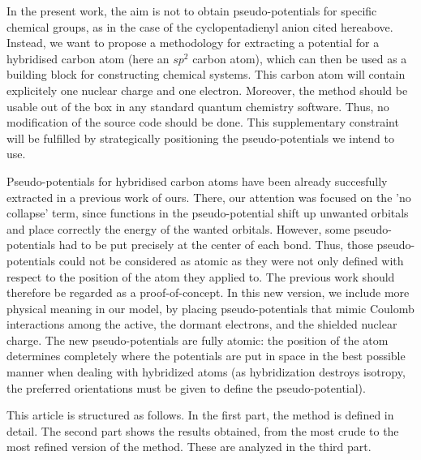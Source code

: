 \documentclass[journal=jctcce,manuscript=article]{achemso}
\begin{document}

In the present work, the aim is not to obtain pseudo-potentials for  specific
chemical groups, as in the case of the cyclopentadienyl anion cited hereabove.
Instead, we want to propose a methodology for extracting a potential for
a hybridised carbon atom (here an $sp^2$ carbon atom), which can then be
used as a building block for constructing chemical systems. This carbon atom
will contain explicitely one nuclear charge and one electron.
Moreover, the method should be usable 
out of the box in any standard quantum chemistry software.
Thus, no modification of the source code should be done.
This supplementary constraint will be fulfilled by strategically positioning the pseudo-potentials
we intend to use. 

Pseudo-potentials for hybridised carbon
atoms have been already succesfully extracted in a previous work of ours.\cite{drujon_pseudopotentials_2013}
There, our attention was focused on the 'no collapse' term, since 
functions in the pseudo-potential shift up unwanted orbitals and place correctly the energy of the
wanted orbitals.
However, some pseudo-potentials had to be put precisely at the center
of each bond.
Thus, those pseudo-potentials could not be considered as atomic as they were not only defined
with respect to the position of the atom they applied to. The previous work should therefore be regarded as a proof-of-concept.
In this new version, we include more physical meaning in our model, 
by placing pseudo-potentials that mimic Coulomb interactions among the active,
the dormant electrons, and the shielded nuclear charge. 
The new pseudo-potentials are fully atomic: the position of the atom
determines completely where the potentials are put in space in the best possible manner
when dealing with hybridized atoms (as hybridization destroys isotropy, the preferred orientations
must be given to define the pseudo-potential).

This article is structured as follows.
In the first part, the method is defined in detail.
The second part shows the results obtained, from the most crude to the most refined
version of the method.
These are analyzed in the third part.
\end{document}
